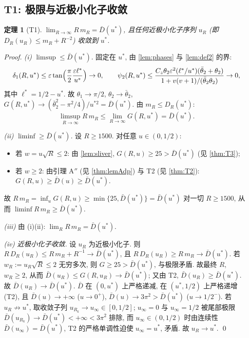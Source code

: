 \documentclass[UTF8]{ctexart}
\newtheorem{theorem}{定理}[section]
\begin{document}
\subsection{T1: 极限与近极小化子收敛}\label{sec:T1}
\begin{theorem}[T1]\label{thm:T1}
$\lim_{R\to\infty}R\,m_R=\bar D(u^*)$, 且任何近极小化子序列 $u_R$ (即
$D_R(u_R)\le m_R+R^{-2}$) 收敛到 $u^*$.
\end{theorem}
\begin{proof}
\emph{(i) $\limsup\le\bar D(u^*)$.}
固定在 $u^*$, 由 \ref{lem:phases} 与 \ref{lem:def2} 的界:
\begin{equation}
	\delta_1(R,u^*)\le\varepsilon\tan\Bigl(\frac\pi2\frac{\varepsilon\ell^*}{u^*}\Bigr)\to0,
	\qquad
	\psi_2(R,u^*)\le
	\frac{C_z\theta_2\varepsilon^2(\ell^*/u^*)(\bar\theta_2+\theta_2)}
	{1+v(v+1)/(\bar\theta_2\theta_2)}\to0,
\end{equation}
其中 $\ell^*=1/2-u^*$. 故 $\theta_1\to\pi/2$, $\theta_2\to\bar\theta_2$,
$G(R,u^*)\to(\bar\theta_2^2-\pi^2/4)/u^{*2}=\bar D(u^*)$.
由 $m_R\le D_R(u^*)$:
\begin{equation}
	\limsup_{R\to\infty}R\,m_R\le\lim_{R\to\infty}G(R,u^*)=\bar D(u^*).
\end{equation}

\emph{(ii) $\liminf\ge\bar D(u^*)$.}
设 $R\ge1500$. 对任意 $u\in(0,1/2)$:
\begin{itemize}
	\item 若 $w=u\sqrt R\le2$: 由 \ref{lem:sliver}, $G(R,u)\ge25>\bar D(u^*)$ (见 \ref{thm:T3});
	\item 若 $w\ge2$: 由引理 A$''$ (见 \ref{thm:lemAdp}) 与 T2 (见 \ref{thm:T2}):
		$G(R,u)\ge\bar D(u)\ge\bar D(u^*)$.
\end{itemize}
故 $R\,m_R=\inf_u G(R,u)\ge\min\{25,\bar D(u^*)\}=\bar D(u^*)$ 对一切 $R\ge1500$,
从而 $\liminf R\,m_R\ge\bar D(u^*)$.

\emph{(iii)} 由 (i)(ii): $\lim_R R\,m_R=\bar D(u^*)$.

\emph{(iv) 近极小化子收敛.} 设 $u_R$ 为近极小化子. 则
$R\,D_R(u_R)\le R\,m_R+R^{-1}\to\bar D(u^*)$, 且 $R\,D_R(u_R)\ge R\,m_R\to\bar D(u^*)$.
若 $w_R:=u_R\sqrt R\le2$ 无穷多次, 则 $G\ge25>\bar D(u^*)$, 与极限矛盾.
故最终 $R$, $w_R\ge2$, 从而 $\bar D(u_R)\le G(R,u_R)\to\bar D(u^*)$;
又由 T2, $\bar D(u_R)\ge\bar D(u^*)$. 故 $\bar D(u_R)\to\bar D(u^*)$.
$\bar D$ 在 $(0,u^*)$ 上严格递减, 在 $(u^*,1/2)$ 上严格递增 (T2),
且 $\bar D(u)\to+\infty$ ($u\to0^+$), $\bar D(u)\to3\pi^2>\bar D(u^*)$ ($u\to1/2^-$).
若 $u_R\not\to u^*$, 取收敛子列 $u_{R_k}\to u_\infty\in[0,1/2]$; $u_\infty=0$ 与 $u_\infty=1/2$ 被尾部极限 $\bar D(u_{R_k})\to\bar D(u^*)<+\infty<3\pi^2$ 排除, 而 $u_\infty\in(0,1/2)$ 时由连续性 $\bar D(u_\infty)=\bar D(u^*)$, T2 的严格单调性迫使 $u_\infty=u^*$, 矛盾. 故 $u_R\to u^*$. \qed
\end{proof}
\end{document}
